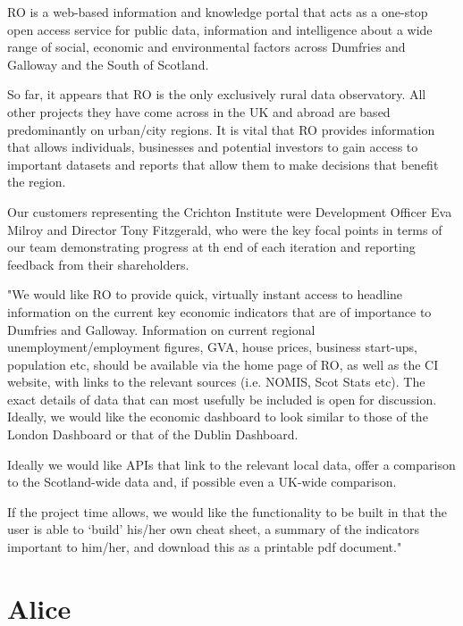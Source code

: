 \documentclass{l3proj}
\begin{document}
RO is a web-based information and knowledge portal that acts as a one-stop open access service for public data, information and
intelligence about a wide range of social, economic and environmental factors across Dumfries and Galloway and the South of Scotland.

So far, it appears that RO is the only exclusively rural data observatory. All other projects they have come across in the UK and abroad
are based predominantly on urban/city regions. It is vital that RO provides information that allows individuals, businesses and potential
investors to gain access to important datasets and reports that allow them to make decisions that benefit the region.

Our customers representing the Crichton Institute were Development Officer Eva Milroy and Director Tony Fitzgerald, who were the key
focal points in terms of our team demonstrating progress at th end of each iteration and reporting feedback from their shareholders.


"We would like RO to provide quick, virtually instant access to headline information on the current key economic indicators that are of
importance to Dumfries and Galloway. Information on current regional unemployment/employment figures, GVA, house prices, business start-ups,
population etc, should be available via the home page of RO, as well as the CI website, with links to the relevant sources
(i.e. NOMIS, Scot Stats etc). The exact details of data that can most usefully be included is open for discussion. Ideally, we would like
the economic dashboard to look similar to those of the London Dashboard or that of the Dublin Dashboard.

Ideally we would like APIs that link to the relevant local data, offer a comparison to the Scotland-wide data and,
if possible even a UK-wide comparison.

If the project time allows, we would like the functionality to be built in that the user is able to ‘build’ his/her own cheat sheet,
a summary of the indicators important to him/her, and download this as a printable pdf document."


\section{Alice}
\end{document}
